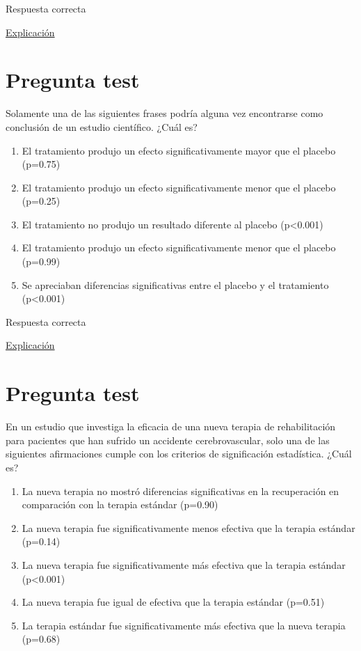 \documentclass[
]{book}
\providecommand{\tightlist}{%
  \setlength{\itemsep}{0pt}\setlength{\parskip}{0pt}}
\begin{document}
Respuesta correcta

\href{https://homepage.divms.uiowa.edu/~mbognar/applets/normal.html}{Explicación}

\hypertarget{pregunta-test-116}{%
\section{Pregunta test}\label{pregunta-test-116}}

Solamente una de las siguientes frases podría alguna vez encontrarse como conclusión de un estudio científico. ¿Cuál es?

\begin{enumerate}
\def\labelenumi{\alph{enumi})}
\tightlist
\item
  El tratamiento produjo un efecto significativamente mayor que el placebo (p=0.75)
\item
  El tratamiento produjo un efecto significativamente menor que el placebo (p=0.25)
\item
  El tratamiento no produjo un resultado diferente al placebo (p\textless0.001)
\item
  El tratamiento produjo un efecto significativamente menor que el placebo (p=0.99)
\item
  Se apreciaban diferencias significativas entre el placebo y el tratamiento (p\textless0.001)
\end{enumerate}

Respuesta correcta

\href{https://1fjmanzano.github.io/bioestadistica/contrastes-de-hipo\%CC\%81tesis.html\#contrastes-bilaterales-y-unilaterales}{Explicación}

\hypertarget{pregunta-test-117}{%
\section{Pregunta test}\label{pregunta-test-117}}

En un estudio que investiga la eficacia de una nueva terapia de rehabilitación para pacientes que han sufrido un accidente cerebrovascular, solo una de las siguientes afirmaciones cumple con los criterios de significación estadística. ¿Cuál es?

\begin{enumerate}
\def\labelenumi{\alph{enumi})}
\tightlist
\item
  La nueva terapia no mostró diferencias significativas en la recuperación en comparación con la terapia estándar (p=0.90)
\item
  La nueva terapia fue significativamente menos efectiva que la terapia estándar (p=0.14)
\item
  La nueva terapia fue significativamente más efectiva que la terapia estándar (p\textless0.001)
\item
  La nueva terapia fue igual de efectiva que la terapia estándar (p=0.51)
\item
  La terapia estándar fue significativamente más efectiva que la nueva terapia (p=0.68)
\end{enumerate}
\end{document}
